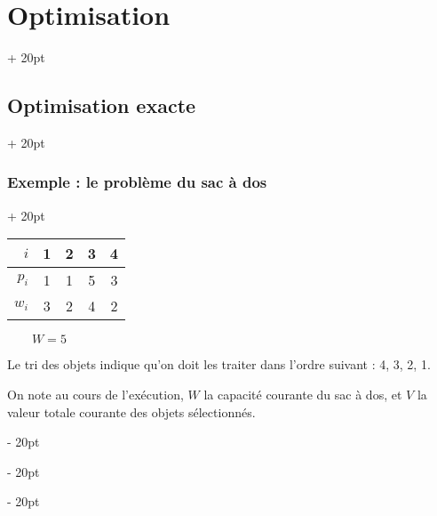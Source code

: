 \documentclass[a4paper, 12pt, twoside]{article}
\newcommand{\ind}[1][20pt]{\advance\leftskip + #1}
\newcommand{\deind}[1][20pt]{\advance\leftskip - #1}
\newenvironment{indt}[2][20pt]{#2 \par \ind[#1]}{\par \deind} %
\newcommand{\1}{\mathbbm 1}
\begin{document}
\begin{indt}{\section{Optimisation}}
\begin{indt}{\subsection{Optimisation exacte}}
\begin{indt}{\subsubsection{Exemple : le problème du sac à dos}}
                \begin{center}
                    \begin{tabular}{r|cccc}
                        $i$ & 1 & 2 & 3 & 4
                        \\
                        \hline
                        $p_i$ & 1 & 1 & 5 & 3
                        \\
                        \hline
                        $w_i$ & 3 & 2 & 4 & 2
                    \end{tabular}
                    $\qquad W = 5$
                \end{center}

                Le tri des objets indique qu'on doit les traiter dans l'ordre suivant : 4, 3, 2, 1.

                On note au cours de l'exécution, $W$ la capacité courante du sac à dos, et $V$ la valeur totale courante des objets sélectionnés.


\end{indt}
\end{indt}
\end{indt}
\end{document}
